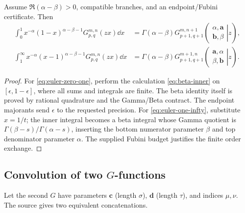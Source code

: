 \begin{theorem}\label{thm:euler-integrals}
Assume $\Re(\alpha-\beta)>0$, compatible branches, and an endpoint/Fubini
certificate.  Then
\begin{align}
\int_0^1x^{-\alpha}(1-x)^{\alpha-\beta-1}
G_{p,q}^{m,n}(zx)\dd x
&=\Gamma(\alpha-\beta)
G_{p+1,q+1}^{m,n+1}\!\left(
 \left.\begin{matrix}\alpha,\mathbf a\\\mathbf b,\beta\end{matrix}\right|z\right),
\label{eq:euler-zero-one}\\
\int_1^\infty x^{-\alpha}(x-1)^{\alpha-\beta-1}
G_{p,q}^{m,n}(zx)\dd x
&=\Gamma(\alpha-\beta)
G_{p+1,q+1}^{m+1,n}\!\left(
 \left.\begin{matrix}\mathbf a,\alpha\\\beta,\mathbf b\end{matrix}\right|z\right).
\label{eq:euler-one-infty}
\end{align}
\end{theorem}
\begin{proof}
For \eqref{eq:euler-zero-one}, perform the calculation
\eqref{eq:beta-inner} on $[\epsilon,1-\epsilon]$, where all sums and integrals
are finite.  The beta identity itself is proved by rational quadrature and the
Gamma/Beta contract.  The endpoint majorants send $\epsilon$ to the requested
precision.  For \eqref{eq:euler-one-infty}, substitute $x=1/t$; the inner
integral becomes a beta integral whose Gamma quotient is
$\Gamma(\beta-s)/\Gamma(\alpha-s)$, inserting the bottom numerator parameter
$\beta$ and top denominator parameter $\alpha$.  The supplied Fubini budget
justifies the finite order exchange.
\end{proof}

\subsection{Convolution of two \texorpdfstring{$G$}{G}-functions}

Let the second $G$ have parameters $\mathbf c$ (length $\sigma$),
$\mathbf d$ (length $\tau$), and indices $\mu,\nu$.  The source gives two
equivalent concatenations.

